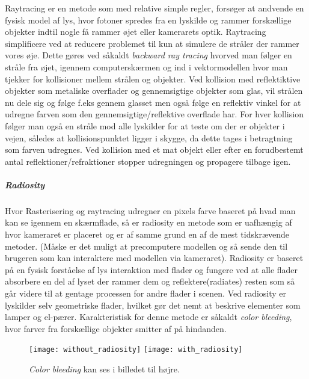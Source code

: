 Raytracing er en metode som med relative simple regler, forsøger at andvende en fysisk model af lys, hvor fotoner spredes fra en lyskilde og rammer forskællige objekter indtil nogle få rammer øjet eller kamerarets optik. Raytracing simplificere ved at reducere problemet til kun at simulere de stråler der rammer vores øje. Dette gøres ved såkaldt \textit{backward ray tracing} hvorved man følger en stråle fra øjet, igennem computerskærmen og ind i vektormodellen hvor man tjekker for kollisioner mellem strålen og objekter. Ved kollision med reflektiktive objekter som metaliske overflader og gennemsigtige objekter som glas, vil strålen nu dele sig og følge f.eks gennem glasset men også følge en reflektiv vinkel for at udregne farven som den gennemsigtige/reflektive overflade har. For hver kollision følger man også en stråle mod alle lyskilder for at teste om der er objekter i vejen, således at kollisionspunktet ligger i skygge, da dette tages i betragtning som farven udregnes. Ved kollision med et mat objekt eller efter en forudbestemt antal reflektioner/refraktioner stopper udregningen og propagere tilbage igen.
\subparagraph{Radiosity}
Hvor Rasterisering og raytracing udregner en pixels farve baseret på hvad man kan se igennem en skærmflade, så er radiosity en metode som er uafhængig af hvor kameraret er placeret og er af samme grund en af de mest tidskrævende metoder. (Måske er det muligt at precomputere modellen og så sende den til brugeren som kan interaktere med modellen via kameraret). Radiosity er baseret på en fysisk forståelse af lys interaktion med flader og fungere ved at alle flader absorbere en del af lyset der rammer dem og reflektere(radiates) resten som så går videre til at gentage processen for andre flader i scenen. Ved radiosity er lyskilder selv geometriske flader, hvilket gør det nemt at beskrive elementer som lamper og el-pærer. Karakteristisk for denne metode er såkaldt \textit{color bleeding}, hvor farver fra forskællige objekter smitter af på hindanden.
\begin{figure}[H]
    \centering
    \texttt{[image: without\_radiosity]}
    \texttt{[image: with\_radiosity]}
    \caption{\textit{Color bleeding} kan ses i billedet til højre.}
    \label{fig:colorbleeding}
\end{figure}
